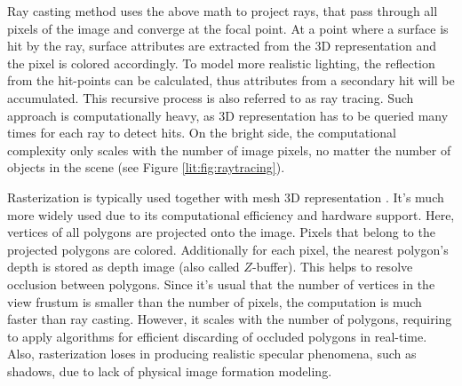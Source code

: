 Ray casting method uses the above math to project rays, that pass through all pixels of the image and converge at the focal point. At a point where a surface is hit by the ray, surface attributes are extracted from the 3D representation and the pixel is colored accordingly. To model more realistic lighting, the reflection from the hit-points can be calculated, thus attributes from a secondary hit will be accumulated. This recursive process is also referred to as ray tracing. Such approach is computationally heavy, as 3D representation has to be queried many times for each ray to detect hits. On the bright side, the computational complexity only scales with the number of image pixels, no matter the number of objects in the scene (see Figure \ref{lit:fig:raytracing}).

Rasterization is typically used together with mesh 3D representation \cite{aux:raster94}. It's much more widely used due to its computational efficiency and hardware support. Here, vertices of all polygons are projected onto the image. Pixels that belong to the projected polygons are colored. Additionally for each pixel, the nearest polygon's depth is stored as depth image (also called $Z$-buffer). This helps to resolve occlusion between polygons. Since it's usual that the number of vertices in the view frustum is smaller than the number of pixels, the computation is much faster than ray casting. However, it scales with the number of polygons, requiring to apply algorithms for efficient discarding of occluded polygons in real-time. Also, rasterization loses in producing realistic specular phenomena, such as shadows, due to lack of physical image formation modeling.





